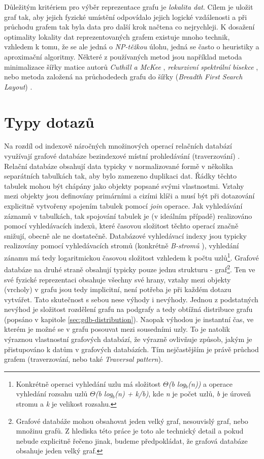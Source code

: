 Důležitým kritériem pro výběr reprezentace grafu je \textit{lokalita dat}. Cílem je uložit graf tak, aby jejich fyzické umístění odpovídalo jejich logické vzdálenosti a při průchodu grafem tak byla data pro další krok načtena co nejrychleji. K dosažení optimality lokality dat reprezentovaných grafem existuje mnoho technik, vzhledem k tomu, že se ale jedná o \textit{NP-těžkou} úlohu, jedná se často o heuristiky a aproximační algoritmy. Některé z používaných metod jsou například metoda minimalizace šířky matice autorů \textit{Cuthill a McKee} \cite{Cuthill69}, \textit{rekurzivní spektrální bisekce} \cite{Barnard93}, nebo metoda založená na průchodedech grafu do šířky (\textit{Breadth First Search Layout}) \cite{Furaih98}.


\section{Typy dotazů}
\label{sec:gdb-dotazy}

Na rozdíl od indexově náročných množinových operací relačních databází využívají grafové databáze bezindexové místní prohledávání (traverzování) \cite{Anglels08}. Relační databáze obsahují data typicky v normalizované formě v několika separátních tabulkách tak, aby bylo zamezeno duplikaci dat. Řádky těchto tabulek mohou být chápány jako objekty popsané svými vlastnostmi. Vztahy mezi objekty jsou definovány primárními a cizími klíči a musí být při dotazování explicitně vytvořeny spojením tabulek pomocí \textit{join} operace. Jak vyhledávání záznamů v tabulkách, tak spojování tabulek je (v ideálním případě) realizováno pomocí vyhledávacích indexů, které časovou složitost těchto operací značně snižují, obecně ale ne dostatečně. Databázové vyhledávací indexy jsou typicky realizovány pomocí vyhledávacích stromů (konkrétně \textit{B-stromů} \cite{Leach05}), vyhledání zánamu má tedy logaritmickou časovou složitost vzhledem k počtu uzlů\footnote{Konkrétně operaci vyhledání uzlu má složitost \textit{$\Theta$(b log$_b$(n))} a operace vyhledání rozsahu uzlů \textit{$\Theta$(b log$_b$(n) + k/b)}, kde \textit{n} je počet uzlů, \textit{b} je úroveň stromu a \textit{k} je velikost rozsahu.\cite{Cormen09}}.
Grafové databáze na druhé straně obsahují typicky pouze jednu strukturu - graf\footnote{Grafové databáže mohou obsahovat jeden velký graf, nesouvislý graf, nebo množinu grafů. Z hlediska této práce je toto ale technický detail a pokud nebude explicitně řečeno jinak, budeme předpokládat, že grafová databáze obsahuje jeden velký graf.}. Ten ve své fyzické reprezentaci obsahuje všechny své hrany, vztahy mezi objekty (vrcholy) v grafu jsou tedy implicitní, není potřeba je při každém dotazu vytvářet. Tato skutečnost s sebou nese výhody i nevýhody. Jednou z podstatných nevýhod je složitost rozdělení grafu na podgrafy a tedy obtížná distribuce grafu (popsáno v kapitole \ref{sec:gdb-distribution}). Naopak výhodou je instantní čas, ve kterém je možné se v grafu posouvat mezi sousedními uzly. To je natolik výraznou vlastnostní grafových databází, že výrazně ovlivňuje způsob, jakým je přistupováno k datům v grafových databázích. Tím nejčastějším je právě průchod grafem (traverzování, nebo také \textit{Traversal pattern}).


